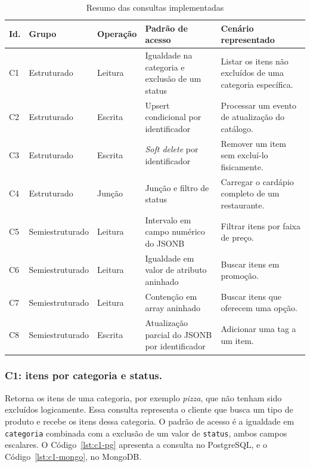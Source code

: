 \begin{table}[H]
    \centering
    \renewcommand{\arraystretch}{1.1}
    \caption{Resumo das consultas implementadas}
    \label{tab:consultas}
    \small
    \begin{tabular}{|l|>{\raggedright\arraybackslash}p{2.5cm}|>{\raggedright\arraybackslash}p{1.8cm}|>{\raggedright\arraybackslash}p{3.9cm}|>{\raggedright\arraybackslash}p{3.9cm}|}
        \hline
        \textbf{Id.} & \textbf{Grupo} & \textbf{Operação} & \textbf{Padrão de acesso} & \textbf{Cenário representado} \\ \hline
        C1 & Estruturado & Leitura & Igualdade na categoria e exclusão de um status & Listar os itens não excluídos de uma categoria específica. \\ \hline
        C2 & Estruturado & Escrita & Upsert condicional por identificador & Processar um evento de atualização do catálogo. \\ \hline
        C3 & Estruturado & Escrita & \textit{Soft delete} por identificador & Remover um item sem excluí-lo fisicamente. \\ \hline
        C4 & Estruturado & Junção & Junção e filtro de status & Carregar o cardápio completo de um restaurante. \\ \hline
        C5 & Semiestruturado & Leitura & Intervalo em campo numérico do JSONB & Filtrar itens por faixa de preço. \\ \hline
        C6 & Semiestruturado & Leitura & Igualdade em valor de atributo aninhado & Buscar itens em promoção. \\ \hline
        C7 & Semiestruturado & Leitura & Contenção em array aninhado & Buscar itens que oferecem uma opção. \\ \hline
        C8 & Semiestruturado & Escrita & Atualização parcial do JSONB por identificador & Adicionar uma tag a um item. \\ \hline
    \end{tabular}
    \vspace{0.4em}
\end{table}

\subsubsection{C1: itens por categoria e status.} Retorna os itens de uma categoria, por exemplo \textit{pizza}, que não tenham sido excluídos logicamente. Essa consulta representa o cliente que busca um tipo de produto e recebe os itens dessa categoria. O padrão de acesso é a igualdade em \texttt{categoria} combinada com a exclusão de um valor de \texttt{status}, ambos campos escalares. O Código~\ref{lst:c1-pg} apresenta a consulta no PostgreSQL, e o Código~\ref{lst:c1-mongo}, no MongoDB.


